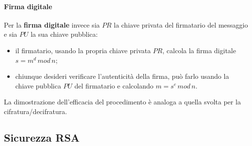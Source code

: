 \paragraph{Firma digitale}
Per la \textbf{firma digitale} invece sia $PR$ la chiave privata del firmatario del messaggio e sia $PU$ la sua chiave pubblica: 
\begin{itemize}
\item il firmatario, usando la propria chiave privata $PR$, calcola la firma digitale $s = m^d \, mod \, n$;
\item chiunque desideri verificare l'autenticità della firma, può farlo usando la chiave pubblica $PU$ del firmatario e calcolando $m = s^e \, mod \, n$.
\end{itemize}
La dimostrazione dell'efficacia del procedimento è analoga a quella svolta per la cifratura/decifratura.

\subsection{Sicurezza RSA}

